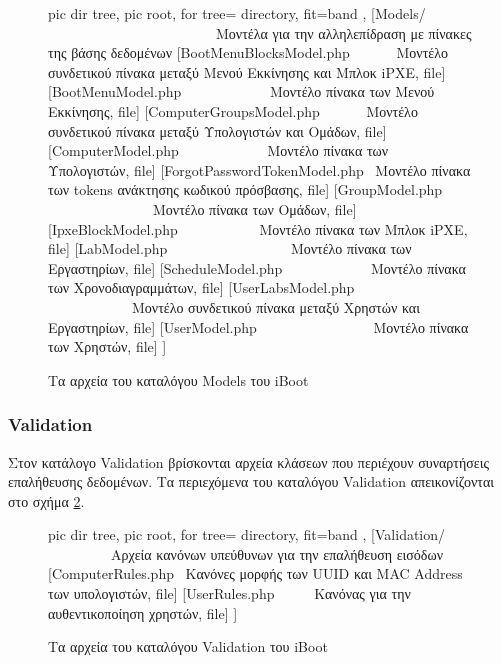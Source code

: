 \begin{figure}
	\centering
	{\footnotesize
		\begin{forest}
			pic dir tree,
			pic root,
			for tree={%
				directory,
				fit=band
			},
			[Models/ \ \ \ \ \ \ \ \ \ \ \ \ \ \ \ \ \ \ \ \ \ \ \ \ Μοντέλα για την αλληλεπίδραση με πίνακες της βάσης δεδομένων
				[BootMenuBlocksModel.php \ \ \ \ \ \ Μοντέλο συνδετικού πίνακα μεταξύ Μενού Εκκίνησης και Μπλοκ iPXE, file]
				[BootMenuModel.php \ \ \ \ \ \ \ \ \ \ \ \ Μοντέλο πίνακα των Μενού Εκκίνησης, file]
				[ComputerGroupsModel.php \ \ \ \ \ \ Μοντέλο συνδετικού πίνακα μεταξύ Υπολογιστών και Ομάδων, file]
				[ComputerModel.php \ \ \ \ \ \ \ \ \ \ \ \ Μοντέλο πίνακα των Υπολογιστών, file]
				[ForgotPasswordTokenModel.php \ Μοντέλο πίνακα των tokens ανάκτησης κωδικού πρόσβασης, file]
				[GroupModel.php \ \ \ \ \ \ \ \ \ \ \ \ \ \ \ Μοντέλο πίνακα των Ομάδων, file]
				[IpxeBlockModel.php \ \ \ \ \ \ \ \ \ \ \ Μοντέλο πίνακα των Μπλοκ iPXE, file]
				[LabModel.php \ \ \ \ \ \ \ \ \ \ \ \ \ \ \ \ \ Μοντέλο πίνακα των Εργαστηρίων, file]
				[ScheduleModel.php \ \ \ \ \ \ \ \ \ \ \ \ Μοντέλο πίνακα των Χρονοδιαγραμμάτων, file]
				[UserLabsModel.php \ \ \ \ \ \ \ \ \ \ \ \ Μοντέλο συνδετικού πίνακα μεταξύ Χρηστών και Εργαστηρίων, file]
				[UserModel.php \ \ \ \ \ \ \ \ \ \ \ \ \ \ \ \ Μοντέλο πίνακα των Χρηστών, file]
			]
		\end{forest}
	}
	\caption{Τα αρχεία του καταλόγου Models του iBoot}
	\label{dir:iBoot-Models}
\end{figure}

\subsubsection{Validation} \label{ui:app:validation}
Στον κατάλογο Validation βρίσκονται αρχεία κλάσεων που περιέχουν συναρτήσεις επαλήθευσης δεδομένων. Τα περιεχόμενα του καταλόγου Validation απεικονίζονται στο σχήμα \ref{dir:iBoot-Validation}.

\begin{figure}
	\centering
	{\footnotesize
		\begin{forest}
			pic dir tree,
			pic root,
			for tree={%
				directory,
				fit=band
			},
			[Validation/ \ \ \ \ \ \ \ \ \ Αρχεία κανόνων υπεύθυνων για την επαλήθευση εισόδων
				[ComputerRules.php \ Κανόνες μορφής των UUID και MAC Address των υπολογιστών, file]
				[UserRules.php \ \ \ \ \ Κανόνας για την αυθεντικοποίηση χρηστών, file]
			]
		\end{forest}
	}
	\caption{Τα αρχεία του καταλόγου Validation του iBoot}
	\label{dir:iBoot-Validation}
\end{figure}

